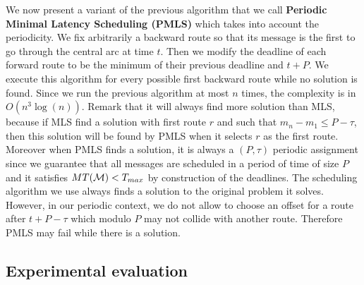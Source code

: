 \documentclass[a4paper,10pt]{article}
\begin{document}
{     We now present a variant of the previous algorithm that we call {\bf Periodic Minimal Latency Scheduling (PMLS)}
     which takes into account the periodicity. We fix arbitrarily a backward route so that its message is the first to go through the central arc at time $t$. Then we modify the deadline of each forward route to be the minimum of their previous deadline and $t + P$.  We execute this algorithm for every possible first backward route while no solution is found. Since we run the previous algorithm at most $n$ times, the complexity is in $O(n^3\log(n))$. Remark that it will always find more solution than MLS,
     because if MLS find a solution with first route $r$ and such that $m_n - m_1 \leq P -\tau$, then this solution will be found by PMLS when it selects $r$ as the first route. Moreover when PMLS finds a solution, it is always a $(P,\tau)$ periodic assignment
     since we guarantee that all messages are scheduled in a period of time of size $P$ and it satisfies $MT({\cal M}) < T_{max}$ by construction of the deadlines. The scheduling algorithm we use always finds a solution to the  original problem it solves. However, in our periodic context, we do not allow to choose an offset for a route after $t+P- \tau$ which modulo $P$ may not collide with another route. Therefore PMLS may fail while there is a solution.
     
%   
%     
% 
%     
% 
% 
    
    \subsection{Experimental evaluation}
    \label{sec:resultsPALL}
    
}
\end{document}
